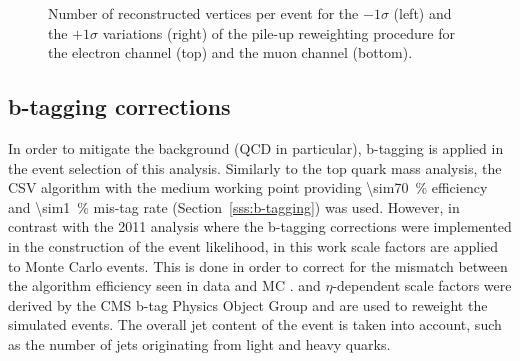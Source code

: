 \begin{figure}[!htpb]
	\caption{\label{fig:pileup_vertices_variations}
    Number of reconstructed vertices per event for the $-1\sigma$ (left) and the $+1\sigma$ variations (right) of
    the pile-up reweighting procedure for the electron channel (top) and the muon channel (bottom).}
\end{figure}


\subsection{b-tagging corrections}
\label{ss_xsection:btagging_corrections}
In order to mitigate the background (QCD in particular), b-tagging is applied in the event selection of this analysis.
Similarly to the top quark mass analysis, the CSV algorithm with the medium working point providing
\SI{\sim70}{\percent} efficiency and \SI{\sim1}{\percent} mis-tag rate (Section~\ref{sss:b-tagging}) was used. However,
in contrast with the 2011 analysis where the b-tagging corrections were implemented in the construction of the event
likelihood, in this work scale factors are applied to Monte Carlo events. This is done in order to correct for the
mismatch between the algorithm efficiency seen in data and MC \autocite{btagging_CMS_8TeV_results}. \pt and
$\eta$-dependent scale factors were derived by the CMS b-tag Physics Object Group \autocite{btag_weights_2011} and are
used to reweight the simulated events. The overall jet content of the event is taken into account, such as the number of
jets originating from light and heavy quarks.

